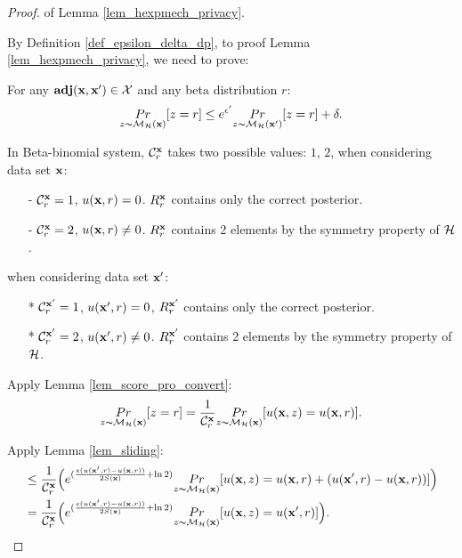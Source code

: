 \documentclass{article}
\begin{document}
\begin{proof} of Lemma \ref{lem_hexpmech_privacy}.

  By Definition \ref{def_epsilon_delta_dp}, to proof Lemma \ref{lem_hexpmech_privacy}, we need to prove:

  For any $\textbf{adj}(\textbf{x},\textbf{x}') \in \mathcal{X}$ and any beta distribution $r$:
  \begin{equation*}
  \underset{z \thicksim \mathcal{M}_{\mathcal{H}}(\textbf{x})}{Pr}[z = r] \leq e^{\epsilon'} \underset{z \thicksim \mathcal{M}_{\mathcal{H}}(\textbf{x}')}{Pr}[z = r] + \delta. 
  \end{equation*}

   In Beta-binomial system, $\mathcal{C}^{\textbf{x}}_{r}$ takes two possible values: $1$, $2$, when considering data set $\textbf{x}$:
\begin{itemize}
  \item[-] $\mathcal{C}^{\textbf{x}}_{r} = 1$, $u(\textbf{x}, {r}) = 0$.  $R^{\textbf{x}}_r$ contains only the correct posterior.
  \item[-] $\mathcal{C}^{\textbf{x}}_{r} = 2$, $u(\textbf{x}, {r}) \neq 0$. $R^{\textbf{x}}_r$ contains 2 elements by the symmetry property of $\mathcal{H}$.
\end{itemize}
 when considering data set $\textbf{x}'$:
  \begin{itemize}
    \item[*] $\mathcal{C}^{\textbf{x}'}_{r} = 1$, $u(\textbf{x}', {r}) = 0$,  $R^{\textbf{x}'}_r$ contains only the correct posterior.
    \item[*] $\mathcal{C}^{\textbf{x}'}_{r} = 2$, $u(\textbf{x}', {r}) \neq 0$. $R^{\textbf{x}'}_r$ contains 2 elements by the symmetry property of $\mathcal{H}$.
  \end{itemize}

 
      Apply Lemma \ref{lem_score_pro_convert}:  
      \begin{equation*}
      \underset{z \thicksim \mathcal{M}_{\mathcal{H}}(\textbf{x})}{Pr}[z = r] = \frac{1}{\mathcal{C}^{\textbf{x}}_{r}} \underset{z \thicksim \mathcal{M}_{\mathcal{H}}(\textbf{x})}{Pr}[u(\textbf{x}, {z}) = u(\textbf{x}, {r})].
      \end{equation*}

      Apply Lemma \ref{lem_sliding}:
      \begin{equation*}
      \begin{split}
      & \leq \frac{1}{\mathcal{C}^{\textbf{x}}_{r}} \Big( e^{(\frac{\epsilon (u(\textbf{x}', {r}) - u(\textbf{x}, {r}))}{2 S(\textbf{x})} + \ln 2)} \underset{z \thicksim \mathcal{M}_{\mathcal{H}}(\textbf{x})}{Pr}[u(\textbf{x}, {z}) = u(\textbf{x}, {r}) + (u(\textbf{x}', {r}) - u(\textbf{x}, {r}))] \Big)\\
      & = \frac{1}{\mathcal{C}^{\textbf{x}}_{r}} \Big( e^{(\frac{\epsilon (u(\textbf{x}', {r}) - u(\textbf{x}, {r}))}{2 S(\textbf{x})} + \ln 2)} \underset{z \thicksim \mathcal{M}_{\mathcal{H}}(\textbf{x})}{Pr}[u(\textbf{x}, {z}) = u(\textbf{x}', {r}) ] \Big).
      \end{split}
      \end{equation*}


\end{proof}
\end{document}
